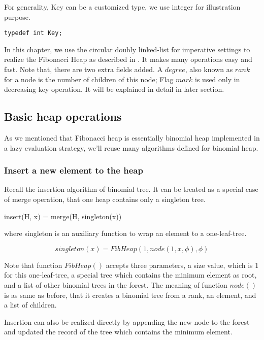 \documentclass{article}
\begin{document}
For generality, Key can be a customized type, we use integer for illustration
purpose.

\lstset{language=C}
\begin{lstlisting}
typedef int Key;
\end{lstlisting}

In this chapter, we use the circular doubly linked-list for imperative
settings to realize the Fibonacci Heap as described in \cite{CLRS}.
It makes many operations easy and fast. Note that, there are two extra
fields added. A $degree$, also known as $rank$ for a node is the number
of children of this node; Flag $mark$ is used only in decreasing key
operation. It will be explained in detail in later section.


\subsection{Basic heap operations}
As we mentioned that Fibonacci heap is essentially binomial heap
implemented in a lazy evaluation strategy, we'll reuse many algorithms
defined for binomial heap.

\subsubsection{Insert a new element to the heap}
Recall the insertion algorithm of binomial tree. It can be treated
as a special case of merge operation, that one heap contains only
a singleton tree.

\be
insert(H, x) = merge(H, singleton(x))
\label{eq:fib-insert}
\ee

where singleton is an auxiliary function to wrap an element to a
one-leaf-tree.

\[
singleton(x) = FibHeap(1, node(1, x, \phi), \phi)
\]

Note that function $FibHeap()$ accepts three parameters, a
size value, which is 1 for this one-leaf-tree, a special tree
which contains the minimum element as root, and a list of other
binomial trees in the forest. The meaning of function $node()$ is
as same as before, that it creates a binomial tree from a rank,
an element, and a list of children.

Insertion can also be realized directly by appending the new node
to the forest and updated the record of the tree which contains the
minimum element.
\end{document}

